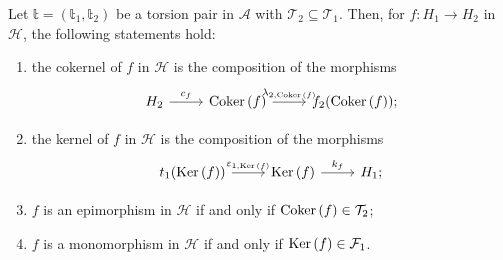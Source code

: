 \begin{corollary}\label{cor:2.3}
  Let $\mathbb{t}=(\mathbb{t}_1,\mathbb{t}_2)$ be a torsion pair in $\mathcal{A}$ with $\mathcal{T}_2\subseteq\mathcal{T}_1$.
  Then, for $f:H_1\to H_2$ in $\mathcal{H}$, the following statements hold:
  \begin{enumerate}[label=(\alph*),ref=(\alph*)]
    \item\label{cor:2.3:a} the cokernel of $f$ in $\mathcal{H}$ is the composition of the morphisms
      \begin{equation*}
        \begin{tikzcd}
          H_2\arrow{r}{c_f}&\Coker(f)\arrow{r}{\lambda_{2,\Coker(f)}}&f_2(\Coker(f));
        \end{tikzcd}
      \end{equation*}
    \item\label{cor:2.3:b} the kernel of $f$ in $\mathcal{H}$ is the composition of the morphisms
      \begin{equation*}
        \begin{tikzcd}
          t_1(\Ker(f))\arrow{r}{\varepsilon_{1,\Ker(f)}}&\Ker(f)\arrow{r}{k_f}&H_1;
        \end{tikzcd}
      \end{equation*}
    \item\label{cor:2.3:c} $f$ is an epimorphism in $\mathcal{H}$ if and only if $\mathrm{\textup{Coker\,}}(f)\in\mathcal{T}_2$;
    \item\label{cor:2.3:d} $f$ is a monomorphism in $\mathcal{H}$ if and only if $\mathrm{\textup{Ker\,}}(f)\in\mathcal{F}_1$.
  \end{enumerate}
\end{corollary}

